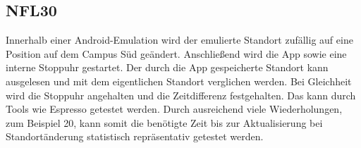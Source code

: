 \subsection*{NFL30}

Innerhalb einer Android-Emulation wird der emulierte Standort zufällig auf eine Position auf dem Campus Süd geändert.
Anschließend wird die App sowie eine interne Stoppuhr gestartet.
Der durch die App gespeicherte Standort kann ausgelesen und mit dem eigentlichen Standort verglichen werden.
Bei Gleichheit wird die Stoppuhr angehalten und die Zeitdifferenz festgehalten.
Das kann durch Tools wie Espresso getestet werden.
Durch ausreichend viele Wiederholungen, zum Beispiel 20, kann somit die benötigte Zeit bis zur Aktualisierung bei Standortänderung statistisch repräsentativ getestet werden.